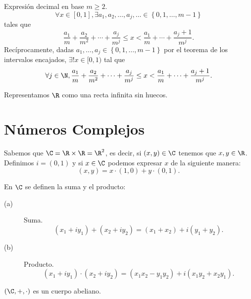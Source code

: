 Expresión decimal en base $\displaystyle m \geq 2 $. 
\[\forall x \in \left[0,1\right], \exists a_{1}, a_{2}, \ldots, a_{j}, \ldots \in \left\{ 0,1, \ldots, m -1 \right\}  \]
tales que
\[\frac{a_{1}}{m} + \frac{a_{2}}{m^{2}} + \cdots + \frac{a_{j}}{m^{j}} \leq x < \frac{a_{1}}{m} + \cdots + \frac{a_{j}+1}{m^{j}} .\]
Recíprocamente, dadas $\displaystyle a_{1}, \ldots, a_{j}\in \left\{ 0,1, \ldots, m -1\right\}  $ por el teorema de los intervalos encajados, $\displaystyle \exists! x \in [0,1) $ tal que 
\[\forall j \in \N, \frac{a_{1}}{m} + \frac{a_{2}}{m^{2}} + \cdots + \frac{a_{j}}{m^{j}} \leq x < \frac{a_{1}}{m} + \cdots + \frac{a_{j}+1}{m^{j}}  .\]

\begin{observation}
\normalfont Representamos $\displaystyle \R $ como una recta infinita sin huecos.
\end{observation}

\section{Números Complejos}

Sabemos que $\displaystyle \C = \R \times \R = \R^{2} $, es decir, si $\displaystyle \left(x,y\right)\in \C $ tenemos que $\displaystyle x, y \in \R $. Definimos $\displaystyle i = \left(0,1\right) $ y si $\displaystyle x \in \C $ podemos expresar $\displaystyle x $ de la siguiente manera:
\[\left(x,y\right) = x \cdot \left(1,0\right) + y \cdot \left(0,1\right) .\]

\begin{fdefinition}[]
\normalfont En $\displaystyle \C $ se definen la suma y el producto:
\begin{description}
\item[(a)] Suma.
	\[\left(x_{1} + iy_{1}\right) + \left(x_{2} + i y _{2}\right) = \left(x_{1} + x_{2}\right) + i \left(y_{1} + y_{2}\right) .\]
\item[(b)] Producto. 
	\[\left(x_{1} + i y_{1}\right) \cdot \left(x_{2} + i y_{2}\right) = \left(x_{1}x_{2}-y_{1}y_{2}\right) + i \left(x_{1}y_{2} + x_{2}y_{1}\right) .\]
\end{description}
\end{fdefinition}

\begin{ftheorem}[]
\normalfont $\displaystyle \left(\C, +, \cdot\right) $ es un cuerpo abeliano.
\end{ftheorem}

